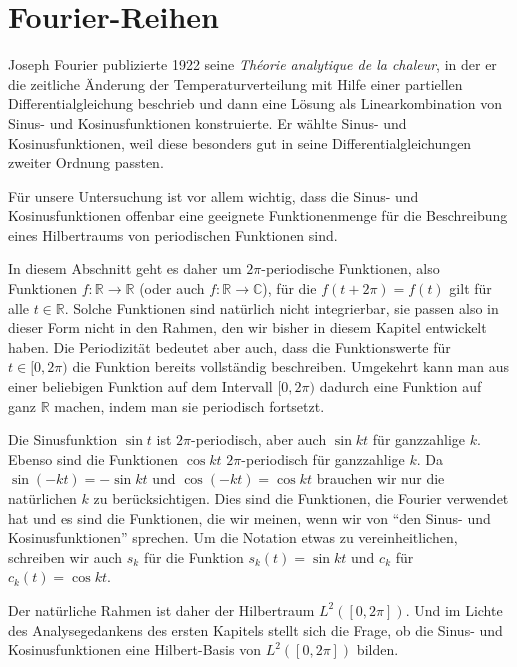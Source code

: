 %
%
%
\section{Fourier-Reihen
\label{section:fourier-reihen}}
Joseph Fourier publizierte 1922 seine {\em Théorie analytique de la chaleur},
in der er die zeitliche Änderung der Temperaturverteilung mit Hilfe einer
partiellen Differentialgleichung beschrieb und dann eine Lösung als
Linearkombination von Sinus- und Kosinusfunktionen konstruierte. 
Er wählte Sinus- und Kosinusfunktionen, weil diese besonders gut in
seine Differentialgleichungen zweiter Ordnung passten.

Für unsere Untersuchung ist vor allem wichtig, dass die Sinus- und
Kosinusfunktionen offenbar eine geeignete Funktionenmenge für die
Beschreibung eines Hilbertraums von periodischen Funktionen sind.

In diesem Abschnitt geht es daher um $2\pi$-periodische Funktionen,
also Funktionen $f\colon \mathbb R\to \mathbb R$ (oder auch
$f\colon\mathbb R\to \mathbb C$),
für die $f(t+2\pi)= f(t)$ gilt für alle $t\in\mathbb R$.  
Solche Funktionen sind natürlich nicht integrierbar, sie passen also
in dieser Form nicht in den Rahmen, den wir bisher in diesem Kapitel
entwickelt haben.
Die Periodizität bedeutet aber auch, dass die Funktionswerte für
$t\in[0,2\pi)$ die Funktion bereits vollständig beschreiben.
Umgekehrt kann man aus einer beliebigen Funktion auf dem Intervall
$[0,2\pi)$ dadurch eine Funktion auf ganz $\mathbb R$ machen, indem
man sie periodisch fortsetzt.

Die Sinusfunktion $\sin t$ ist $2\pi$-periodisch, aber auch 
$\sin kt$ für ganzzahlige $k$.
Ebenso sind die Funktionen $\cos kt$ $2\pi$-periodisch für ganzzahlige $k$.
Da $\sin(-kt)=-\sin kt$ und $\cos(-kt)=\cos kt$ brauchen wir nur die
natürlichen $k$ zu berücksichtigen.
Dies sind die Funktionen, die Fourier verwendet hat und es sind die
Funktionen, die wir meinen, wenn wir von ``den Sinus- und Kosinusfunktionen''
sprechen.
Um die Notation etwas zu vereinheitlichen, schreiben wir auch $s_k$ für
die Funktion $s_k(t)=\sin kt$ und $c_k$ für $c_k(t)=\cos kt$.

Der natürliche Rahmen ist daher der Hilbertraum $L^2([0,2\pi])$.
Und im Lichte des Analysegedankens des ersten Kapitels stellt sich
die Frage, ob die Sinus- und Kosinusfunktionen eine Hilbert-Basis
von $L^2([0,2\pi])$ bilden.

